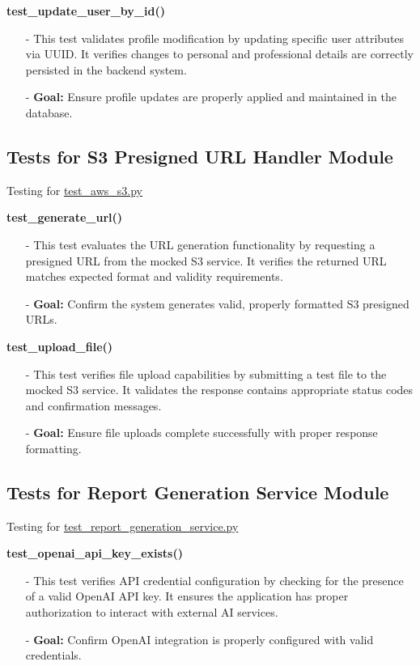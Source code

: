 \documentclass[12pt, titlepage]{article}
\begin{document}
\textbf{test\_update\_user\_by\_id()}
\begin{itemize}
    \item[-] This test validates profile modification by updating specific user attributes via UUID. It verifies changes to personal and professional details are correctly persisted in the backend system.
    \item[-] \textbf{Goal:} Ensure profile updates are properly applied and maintained in the database.
\end{itemize}


\subsection{Tests for S3 Presigned URL Handler Module}
Testing for \href{https://github.com/RezaJodeiri/CXR-Capstone/blob/main/src/backend/test/test_aws_s3.py}{test\_aws\_s3.py}

\textbf{test\_generate\_url()}
\begin{itemize}
    \item[-] This test evaluates the URL generation functionality by requesting a presigned URL from the mocked S3 service. It verifies the returned URL matches expected format and validity requirements.
    \item[-] \textbf{Goal:} Confirm the system generates valid, properly formatted S3 presigned URLs.
\end{itemize}

\textbf{test\_upload\_file()}
\begin{itemize}
    \item[-] This test verifies file upload capabilities by submitting a test file to the mocked S3 service. It validates the response contains appropriate status codes and confirmation messages.
    \item[-] \textbf{Goal:} Ensure file uploads complete successfully with proper response formatting.
\end{itemize}


\subsection{Tests for {Report Generation Service Module}}
Testing for \href{https://github.com/RezaJodeiri/CXR-Capstone/blob/main/src/backend/test/test_report_generation_service.py}{test\_report\_generation\_service.py}

\textbf{test\_openai\_api\_key\_exists()}
\begin{itemize}
    \item[-] This test verifies API credential configuration by checking for the presence of a valid OpenAI API key. It ensures the application has proper authorization to interact with external AI services.
    \item[-] \textbf{Goal:} Confirm OpenAI integration is properly configured with valid credentials.
\end{itemize}
\end{document}
